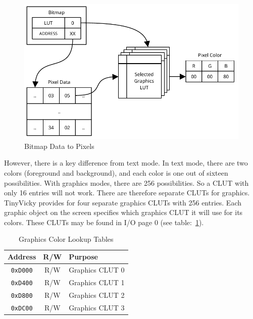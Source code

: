 \begin{figure}[ht]
    \begin{center}
        \includegraphics{images/bitmaps.pdf}
    \end{center}
    \caption{Bitmap Data to Pixels}
    \label{fig:bitmap_colors}
\end{figure}

However, there is a key difference from text mode. In text mode, there are two colors (foreground and background), and each color is one out of sixteen possibilities. With graphics modes, there are 256 possibilities. So a CLUT with only 16 entries will not work. There are therefore separate CLUTs for graphics. TinyVicky provides for four separate graphics CLUTs with 256 entries. Each graphic object on the screen specifies which graphics CLUT it will use for its colors. These CLUTs may be found in I/O page 0 (see table:~\ref{tab:graph_cluts}).

\begin{table}[ht]
    \begin{center}
        \begin{tabular}{|c|c|l|} \hline
            Address & R/W & Purpose \\\hline\hline
            \verb+0xD000+ & R/W & Graphics CLUT 0 \\ \hline
            \verb+0xD400+ & R/W & Graphics CLUT 1 \\ \hline
            \verb+0xD800+ & R/W & Graphics CLUT 2 \\ \hline
            \verb+0xDC00+ & R/W & Graphics CLUT 3 \\ \hline
        \end{tabular}
    \end{center}
    \caption{Graphics Color Lookup Tables}
    \label{tab:graph_cluts}
\end{table}

